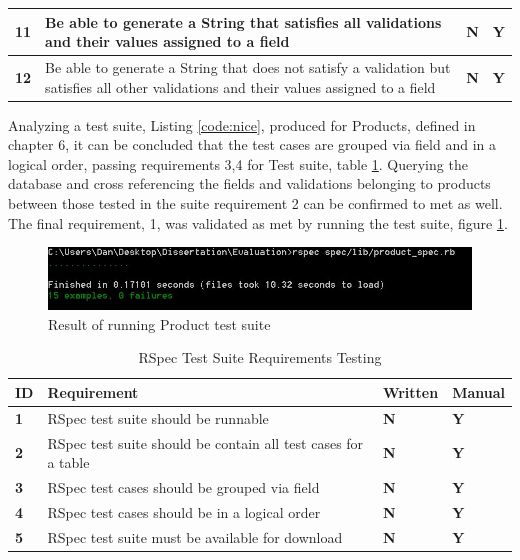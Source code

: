 \documentclass[a4paper,12pt]{article}
\begin{document}
\begin{table}
\begin{tabularx}{\textwidth}{|l|X|l|l|}
\textbf{11} & Be able to generate a String that satisfies all validations and their values assigned to a field                                            & \textbf{N}   & \textbf{Y}       \\ \hline
\textbf{12} & Be able to generate a String that does not satisfy a validation but satisfies all other validations and their values assigned to a field    & \textbf{N}   & \textbf{Y}      \\ \hline
\end{tabularx}
\end{table}

\par Analyzing a test suite, Listing \ref{code:nice}, produced for Products, defined in chapter 6, it can be concluded that the test cases are grouped via field and in a logical order, passing requirements 3,4 for Test suite, table \ref{met:3}. Querying the database and cross referencing the fields and validations belonging to products between those tested in the suite requirement 2 can be confirmed to met as well. The final requirement, 1, was validated as met by running the test suite, figure \ref{fig:runsuite}.

\begin{figure}
\includegraphics[width=\linewidth]{screenshots/runsuite}
\caption{Result of running Product test suite}
\label{fig:runsuite}
\end{figure}

\begin{table}
\centering
\caption{RSpec Test Suite Requirements Testing}
\label{met:3}
\begin{tabularx}{\textwidth}{|l|X|l|l|}
\hline
\textbf{ID} & \textbf{Requirement}                                          & \textbf{Written} & \textbf{Manual} \\ \hline
\textbf{1}  & RSpec test suite should be runnable                          & \textbf{N}   & \textbf{Y}       \\ \hline
\textbf{2}  & RSpec test suite should be contain all test cases for a table  & \textbf{N}   & \textbf{Y}      \\ \hline
\textbf{3}  & RSpec test cases should be grouped via field                 & \textbf{N}   & \textbf{Y}      \\ \hline
\textbf{4}  & RSpec test cases should be in a logical order                 & \textbf{N}   & \textbf{Y}      \\ \hline
\textbf{5}  & RSpec test suite must be available for download               & \textbf{N}   & \textbf{Y}     \\ \hline
\end{tabularx}
\end{table}
\end{document}

